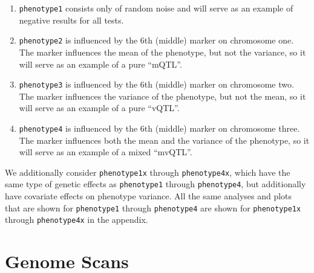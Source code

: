 \documentclass{article}
\begin{document}
\begin{enumerate}
	\item \texttt{phenotype1} consists only of random noise and will serve as an example of negative results for all tests.
	\item \texttt{phenotype2} is influenced by the 6th (middle) marker on chromosome one.  The marker influences the mean of the phenotype, but not the variance, so it will serve as an example of a pure ``mQTL''.
	\item \texttt{phenotype3} is influenced by the 6th (middle) marker on chromosome two.  The marker influences the variance of the phenotype, but not the mean, so it will serve as an example of a pure ``vQTL''.
	\item \texttt{phenotype4} is influenced by the 6th (middle) marker on chromosome three.  The marker influences both the mean and the variance of the phenotype, so it will serve as an example of a mixed ``mvQTL''.
\end{enumerate}

We additionally consider \texttt{phenotype1x} through \texttt{phenotype4x}, which have the same type of genetic effects as \texttt{phenotype1} through \texttt{phenotype4}, but additionally have covariate effects on phenotype variance.
All the same analyses and plots that are shown for \texttt{phenotype1} through \texttt{phenotype4} are shown for \texttt{phenotype1x} through \texttt{phenotype4x} in the appendix.




\section*{Genome Scans}
\end{document}
